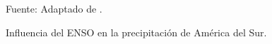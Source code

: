 \begin{figure}[H]
\centering
\caption{Influencia del ENSO en la precipitación de América del Sur.}
%
                {Fuente: Adaptado de \cite{barr2019}.}
\label{fig-enso3}
\end{figure}